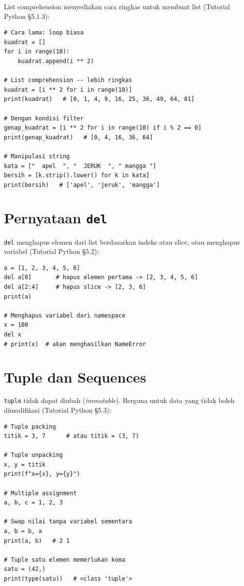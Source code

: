 \documentclass[../main.tex]{subfiles}
\begin{document}
List comprehension menyediakan cara ringkas untuk membuat list (Tutorial Python §5.1.3):

\begin{lstlisting}[caption=List comprehension]
# Cara lama: loop biasa
kuadrat = []
for i in range(10):
    kuadrat.append(i ** 2)

# List comprehension -- lebih ringkas
kuadrat = [i ** 2 for i in range(10)]
print(kuadrat)   # [0, 1, 4, 9, 16, 25, 36, 49, 64, 81]

# Dengan kondisi filter
genap_kuadrat = [i ** 2 for i in range(10) if i % 2 == 0]
print(genap_kuadrat)   # [0, 4, 16, 36, 64]

# Manipulasi string
kata = ["  apel  ", "  JERUK  ", " mangga "]
bersih = [k.strip().lower() for k in kata]
print(bersih)   # ['apel', 'jeruk', 'mangga']
\end{lstlisting}

\section{Pernyataan \texttt{del}}

\texttt{del} menghapus elemen dari list berdasarkan indeks atau slice, atau menghapus variabel (Tutorial Python §5.2):

\begin{lstlisting}[caption=Pernyataan del]
a = [1, 2, 3, 4, 5, 6]
del a[0]       # hapus elemen pertama -> [2, 3, 4, 5, 6]
del a[2:4]     # hapus slice -> [2, 3, 6]
print(a)

# Menghapus variabel dari namespace
x = 100
del x
# print(x)  # akan menghasilkan NameError
\end{lstlisting}

\section{Tuple dan Sequences}

\texttt{tuple} tidak dapat diubah (\textit{immutable}). Berguna untuk data yang tidak boleh dimodifikasi (Tutorial Python §5.3):

\begin{lstlisting}[caption=Tuple: packing dan unpacking]
# Tuple packing
titik = 3, 7      # atau titik = (3, 7)

# Tuple unpacking
x, y = titik
print(f"x={x}, y={y}")

# Multiple assignment
a, b, c = 1, 2, 3

# Swap nilai tanpa variabel sementara
a, b = b, a
print(a, b)   # 2 1

# Tuple satu elemen memerlukan koma
satu = (42,)
print(type(satu))   # <class 'tuple'>
\end{lstlisting}
\end{document}
